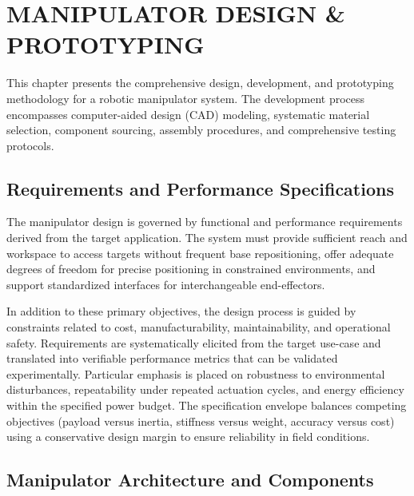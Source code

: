 \chapter{MANIPULATOR DESIGN \& PROTOTYPING}

This chapter presents the comprehensive design, development, and prototyping methodology for a robotic manipulator system. The development 
process encompasses computer-aided design (CAD) modeling, systematic material selection, component sourcing, assembly procedures, and comprehensive 
testing protocols.

\section{Requirements and Performance Specifications}

The manipulator design is governed by functional and performance requirements derived from the target application. The system must provide 
sufficient reach and workspace to access targets without frequent base repositioning, offer adequate degrees of freedom for precise positioning
 in constrained environments, and support standardized interfaces for interchangeable end-effectors.

In addition to these primary objectives, the design process is guided by constraints related to cost, manufacturability, maintainability,
 and operational safety. Requirements are systematically elicited from the target use-case and translated into verifiable performance metrics that can be 
 validated experimentally. Particular emphasis is placed on robustness to environmental disturbances, repeatability under repeated actuation 
 cycles, and energy efficiency within the specified power budget. The specification envelope balances competing objectives
  (payload versus inertia, stiffness versus weight, accuracy versus cost) using a conservative design margin to ensure reliability in field 
  conditions.


\section{Manipulator Architecture and Components}

